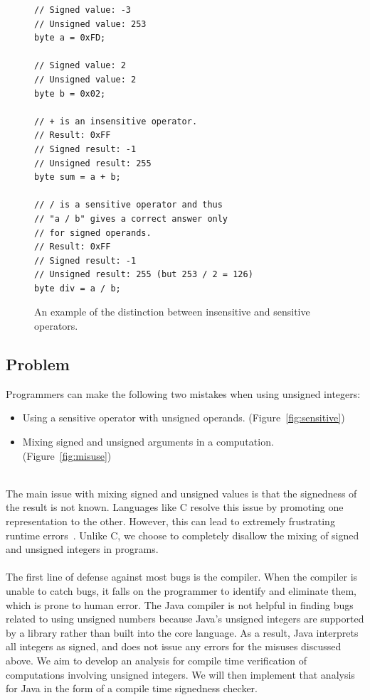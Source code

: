 \begin{figure}[t]
\begin{lstlisting}
// Signed value: -3
// Unsigned value: 253
byte a = 0xFD;

// Signed value: 2
// Unsigned value: 2
byte b = 0x02;

// + is an insensitive operator.
// Result: 0xFF
// Signed result: -1
// Unsigned result: 255
byte sum = a + b;

// / is a sensitive operator and thus
// "a / b" gives a correct answer only
// for signed operands.
// Result: 0xFF
// Signed result: -1
// Unsigned result: 255 (but 253 / 2 = 126)
byte div = a / b;
\end{lstlisting}
\vspace{-10pt}
\caption{An example of the distinction between insensitive and sensitive
operators.}
\label{fig:operators}
\end{figure}

\subsection{Problem}
Programmers can make the following two mistakes when using unsigned integers:

\begin{itemize}
  \item Using a sensitive operator with unsigned operands. (Figure~\ref{fig:sensitive})
  \item Mixing signed and unsigned arguments in a computation. (Figure~\ref{fig:misuse})
\end{itemize}

\noindent\\
The main issue with
mixing signed and unsigned values is that the signedness of the result is
not known. Languages like C resolve this issue by promoting
one representation to the other.
However, this can lead to extremely
frustrating runtime errors~\cite{WhyNotMix}.
Unlike C, we choose to completely disallow
the mixing of signed and unsigned integers in programs.\\
\\
The first line of defense against most bugs is the compiler. When the
compiler is unable to catch bugs, it falls on the programmer to identify and
eliminate them, which is prone to human error. The Java compiler
is not helpful in finding bugs related to using unsigned
numbers because Java's unsigned
integers are supported by a library rather than built into the core language.
As a result, Java interprets all integers as signed, and does not issue any
errors for the misuses discussed above. We aim to develop an analysis
for compile time verification of computations involving unsigned integers.
We will then implement
that analysis for Java in the form of a compile time signedness checker.

